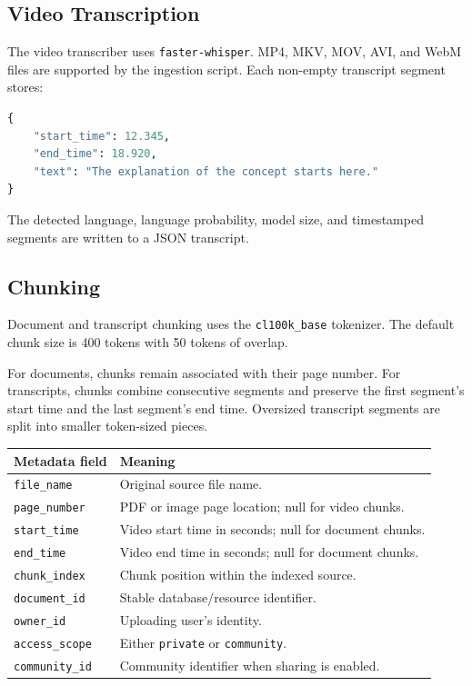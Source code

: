\documentclass[11pt,a4paper]{article}
\begin{document}
\subsection{Video Transcription}

The video transcriber uses \texttt{faster-whisper}. MP4, MKV, MOV, AVI, and
WebM files are supported by the ingestion script. Each non-empty transcript
segment stores:

\begin{lstlisting}[language=Python]
{
    "start_time": 12.345,
    "end_time": 18.920,
    "text": "The explanation of the concept starts here."
}
\end{lstlisting}

The detected language, language probability, model size, and timestamped
segments are written to a JSON transcript.

\subsection{Chunking}

Document and transcript chunking uses the \texttt{cl100k\_base} tokenizer.
The default chunk size is 400 tokens with 50 tokens of overlap.

For documents, chunks remain associated with their page number. For
transcripts, chunks combine consecutive segments and preserve the first
segment's start time and the last segment's end time. Oversized transcript
segments are split into smaller token-sized pieces.

\begin{longtable}{p{}p{}}
\toprule
\textbf{Metadata field} & \textbf{Meaning} \\
\midrule
\texttt{file\_name} & Original source file name. \\
\texttt{page\_number} & PDF or image page location; null for video chunks. \\
\texttt{start\_time} & Video start time in seconds; null for document chunks. \\
\texttt{end\_time} & Video end time in seconds; null for document chunks. \\
\texttt{chunk\_index} & Chunk position within the indexed source. \\
\texttt{document\_id} & Stable database/resource identifier. \\
\texttt{owner\_id} & Uploading user's identity. \\
\texttt{access\_scope} & Either \texttt{private} or \texttt{community}. \\
\texttt{community\_id} & Community identifier when sharing is enabled. \\
\bottomrule
\end{longtable}
\end{document}
